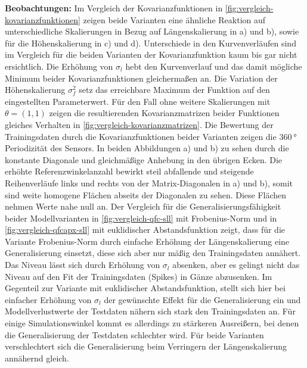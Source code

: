 \textbf{Beobachtungen:} Im Vergleich der Kovarianzfunktionen in \autoref{fig:vergleich-kovarianzfunktionen} zeigen beide Varianten eine ähnliche Reaktion auf unterschiedliche Skalierungen in Bezug auf Längenskalierung in a) und b), sowie für die Höhenskalierung in c) und d). Unterschiede in den Kurvenverläufen sind im Vergleich für die beiden Varianten der Kovarianzfunktion kaum bis gar nicht ersichtlich. Die Erhöhung von $\sigma_l$ hebt den Kurvenverlauf und das damit mögliche Minimum beider Kovarianzfunktionen gleichermaßen an. Die Variation der Höhenskalierung $\sigma_f^2$ setz das erreichbare Maximum der Funktion auf den eingestellten Parameterwert.
Für den Fall ohne weitere Skalierungen mit $\theta = (1,1)$ zeigen die resultierenden Kovarianzmatrizen beider Funktionen gleiches Verhalten in \autoref{fig:vergleich-kovarianzmatrizen}. Die Bewertung der Trainingsdaten durch die Kovarianzfunktionen beider Varianten zeigen die $\SI{360}{\degree}$ Periodizität des Sensors. In beiden Abbildungen a) und b) zu sehen durch die konstante Diagonale und gleichmäßige Anhebung in den übrigen Ecken. Die erhöhte Referenzwinkelanzahl bewirkt steil abfallende und steigende Reihenverläufe links und rechts von der Matrix-Diagonalen in a) und b), somit sind weite homogene Flächen abseits der Diagonalen zu sehen. Diese Flächen nehmen Werte nahe null an. Der Vergleich für die Generalisierungsfähigkeit beider Modellvarianten in \autoref{fig:vergleich-qfc-sll} mit Frobenius-Norm und in \autoref{fig:vergleich-qfcapx-sll} mit euklidischer Abstandsfunktion zeigt, dass für die Variante Frobenius-Norm durch einfache Erhöhung der Längenskalierung eine Generalisierung einsetzt, diese sich aber nur mäßig den Trainingsdaten annähert. Das Niveau lässt sich durch Erhöhung von $\sigma_l$ absenken, aber es gelingt nicht das Niveau auf den Fit der Trainingsdaten (Spikes) in Gänze abzusenken. Im Gegenteil zur Variante mit euklidischer Abstandsfunktion, stellt sich hier bei einfacher Erhöhung von $\sigma_l$ der gewünschte Effekt für die Generalisierung ein und Modellverlustwerte der Testdaten nähern sich stark den Trainingsdaten an. Für einige Simulationswinkel kommt es allerdings zu stärkeren Ausreißern, bei denen die Generalisierung der Testdaten schlechter wird. Für beide Varianten verschlechtert sich die Generalisierung beim Verringern der Längenskalierung annähernd gleich.


